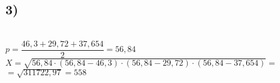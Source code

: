 \documentclass[a4paper, 12pt]{report}
\begin{document}
	\subsection*{3)}
	\\[1ex]
	$p = \dfrac{46,3 + 29,72 + 37,654}{2} = 56,84$\\[1ex]
	$X = \sqrt{56,84 \cdot (56,84-46,3) \cdot (56,84-29,72) \cdot (56,84-37,654)} =$\\[1ex]
	$= \sqrt{311722,97} = 558$\\[1ex]
\end{document}
